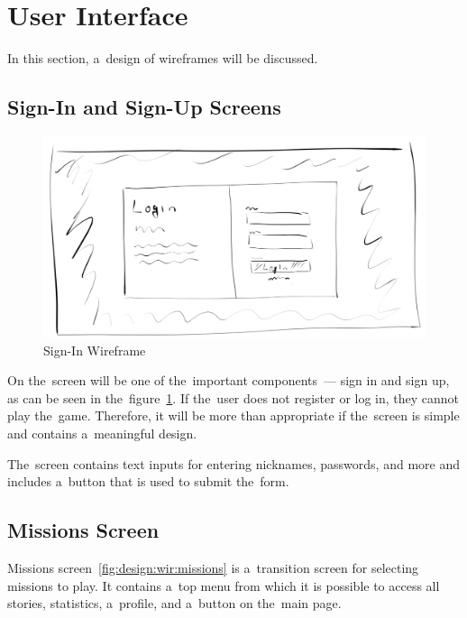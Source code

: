 \section{User Interface}
\label{design:ui}

In this section, a~design of wireframes will be discussed.

\subsection{Sign-In and Sign-Up Screens}

\begin{figure}
    \centering
    \includegraphics[width=1\linewidth]{assets/design/ui/wir_login.png}
    \caption{Sign-In Wireframe}
    \label{fig:design:wir:login}
\end{figure}

On the~screen will be one of the~important components~--- sign in and sign up, as can be seen in the~figure~\ref{fig:design:wir:login}.
If the~user does not register or log in, they cannot play the~game.
Therefore, it will be more than appropriate if the~screen is simple and contains a~meaningful design.

The~screen contains text inputs for entering nicknames, passwords, and more and includes a~button that is used to submit the~form.

\subsection{Missions Screen}

Missions screen~\ref{fig:design:wir:missions} is a~transition screen for selecting missions to play.
\linebreak
It contains a~top menu from which it is possible to access all stories, statistics, a~profile, and a~button on the~main page.

